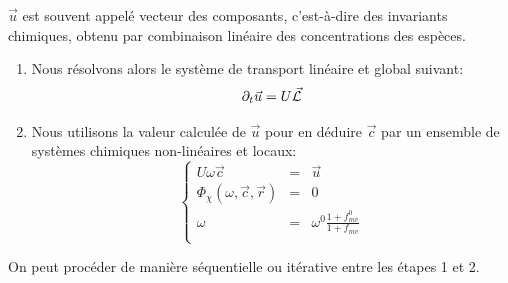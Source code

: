 \begin{appendix}
$\vec{u}$ est souvent appel\'e vecteur des {\color{blue} composants}, c'est-\`a-dire des invariants chimiques, obtenu par combinaison lin\'eaire des concentrations des esp\`eces. 

\begin{enumerate}
\item Nous r\'esolvons alors le syst\`eme de transport {\color{blue}lin\'eaire et global} suivant:
$$
\partial _t \vec{u} =   U\vec{\cal L}  
$$
\item Nous utilisons la valeur calcul\'ee de $\vec{u}$ pour en d\'eduire $\vec{c}$ par un ensemble de syst\`emes chimiques {\color{blue} non-lin\'eaires et locaux}:
$$
\left\{
\begin{array}{lcl}
U\omega \vec{c}  & = &  \displaystyle
  \vec{u}  \\
\Phi _{\chi}(\omega,\vec{c},\vec{r}) & = & 0 \\
\omega  & = & \displaystyle \omega ^0
\frac{1+f_{mv}^0}{1+f_{mv}} \\
\end{array}
\right.
$$


\end{enumerate}

On peut proc\'eder de mani\`ere s\'equentielle ou it\'erative entre les \'etapes 1 et 2. 


\end{appendix}
